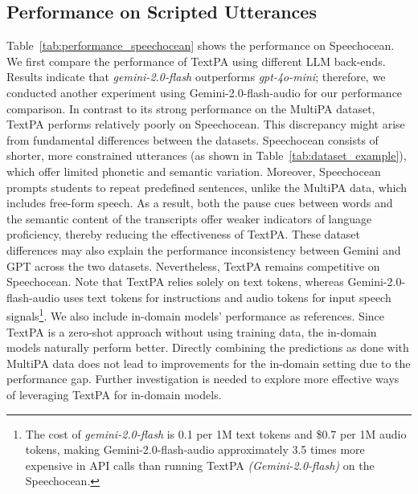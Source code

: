 \documentclass[11pt]{article}
\begin{document}
\subsection{Performance on Scripted Utterances}

Table~\ref{tab:performance_speechocean} shows the performance on Speechocean. We first compare the performance of TextPA using different LLM back-ends. Results indicate that \textit{gemini-2.0-flash} outperforms \textit{gpt-4o-mini}; therefore, we conducted another experiment using Gemini-2.0-flash-audio for our performance comparison. In contrast to its strong performance on the MultiPA dataset, TextPA performs relatively poorly on Speechocean. This discrepancy might arise from fundamental differences between the datasets. Speechocean consists of shorter, more constrained utterances (as shown in Table~\ref{tab:dataset_example}), which offer limited phonetic and semantic variation. Moreover, Speechocean prompts students to repeat predefined sentences, unlike the MultiPA data, which includes free-form speech. As a result, both the pause cues between words and the semantic content of the transcripts offer weaker indicators of language proficiency, thereby reducing the effectiveness of TextPA. These dataset differences may also explain the performance inconsistency between Gemini and GPT across the two datasets. Nevertheless, TextPA remains competitive on Speechocean. Note that TextPA relies solely on text tokens, whereas Gemini-2.0-flash-audio uses text tokens for instructions and audio tokens for input speech signals\footnote{The cost of \textit{gemini-2.0-flash} is 0.1 per 1M text tokens and \$0.7 per 1M audio tokens, making Gemini-2.0-flash-audio approximately 3.5 times more expensive in API calls than running TextPA \textit{(Gemini-2.0-flash)} on the Speechocean.}. We also include in-domain models' performance as references. Since TextPA is a zero-shot approach without using training data, the in-domain models naturally perform better. Directly combining the predictions as done with MultiPA data does not lead to improvements for the in-domain setting due to the performance gap. Further investigation is needed to explore more effective ways of leveraging TextPA for in-domain models.
\end{document}
